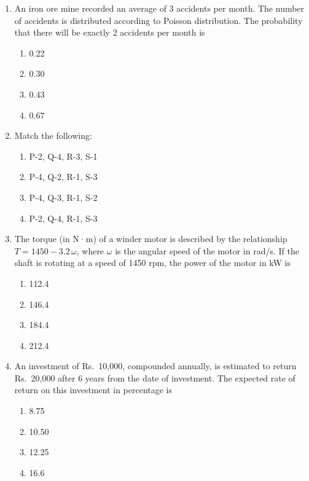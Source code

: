 \documentclass[journal]{IEEEtran}
\begin{document}
\begin{enumerate}[leftmargin=0pt]
\item An iron ore mine recorded an average of 3 accidents per month. The number of accidents is distributed according to Poisson distribution. The probability that there will be exactly 2 accidents per month is
\begin{multicols}{2}
\begin{enumerate}[label=(\Alph*),itemsep=0pt,topsep=2pt]
  \item 0.22
  \item 0.30
  \item 0.43
  \item 0.67
\end{enumerate}
\end{multicols}
\hfill{}

\item Match the following:



\begin{multicols}{2}
\begin{enumerate}[label=(\Alph*),itemsep=0pt,topsep=2pt]
  \item P-2, Q-4, R-3, S-1
  \item P-4, Q-2, R-1, S-3
  \item P-4, Q-3, R-1, S-2
  \item P-2, Q-4, R-1, S-3
\end{enumerate}
\end{multicols}
\hfill{}

\item The torque (in N·m) of a winder motor is described by the relationship $T = 1450 - 3.2\,\omega$, where $\omega$ is the angular speed of the motor in rad/s. If the shaft is rotating at a speed of 1450 rpm, the power of the motor in kW is
\begin{multicols}{2}
\begin{enumerate}[label=(\Alph*),itemsep=0pt,topsep=2pt]
  \item 112.4
  \item 146.4
  \item 184.4
  \item 212.4
\end{enumerate}
\end{multicols}
\hfill{}

\item An investment of Rs.\ 10{,}000, compounded annually, is estimated to return Rs.\ 20{,}000 after 6 years from the date of investment. The expected rate of return on this investment in percentage is
\begin{multicols}{2}
\begin{enumerate}[label=(\Alph*),itemsep=0pt,topsep=2pt]
  \item 8.75
  \item 10.50
  \item 12.25
  \item 16.6
\end{enumerate}
\end{multicols}
\hfill{}


\end{enumerate}
\end{document}

